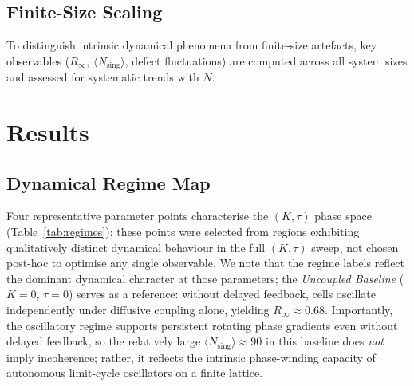 \documentclass[11pt,a4paper]{article}
\begin{document}
\subsection{Finite-Size Scaling}

To distinguish intrinsic dynamical phenomena from finite-size
artefacts, key observables ($R_\infty$, $\langle N_{\text{sing}}
\rangle$, defect fluctuations) are computed across all system
sizes and assessed for systematic trends with $N$.

\section{Results}

\subsection{Dynamical Regime Map}

Four representative parameter points characterise the $(K,\tau)$
phase space (Table~\ref{tab:regimes}); these points were selected
from regions exhibiting qualitatively distinct dynamical behaviour
in the full $(K,\tau)$ sweep, not chosen post-hoc to optimise
any single observable. We note that the regime
labels reflect the dominant dynamical character at those
parameters; the \textit{Uncoupled Baseline} ($K=0$, $\tau=0$)
serves as a reference: without delayed feedback, cells oscillate
independently under diffusive coupling alone, yielding
$R_\infty \approx 0.68$. Importantly, the oscillatory regime
supports persistent rotating phase gradients even without delayed
feedback, so the relatively large $\langle N_{\text{sing}}
\rangle \approx 90$ in this baseline does \emph{not} imply
incoherence; rather, it reflects the intrinsic phase-winding
capacity of autonomous limit-cycle oscillators on a finite
lattice.
\end{document}

